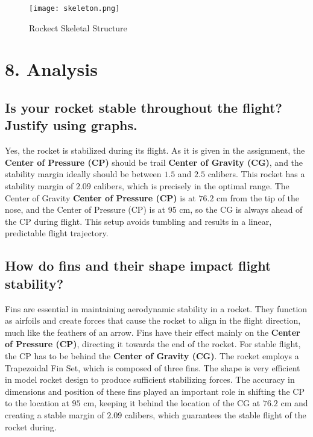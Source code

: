 \documentclass[12pt, a4paper]{article}
\begin{document}
\begin{figure}[H]
    \centering
    \texttt{[image: skeleton.png]}
    \caption{Rockect Skeletal Structure}
    \label{fig:enter-label}
\end{figure}

\section*{8. Analysis}

\subsection{Is your rocket stable throughout the flight? Justify using graphs.}
Yes, the rocket is stabilized during its flight. As it is given in the assignment, the \textbf{Center of Pressure (CP)} should be trail  \textbf{Center of Gravity (CG)}, and the stability margin ideally should be between $1.5$ and $2.5$ calibers. This rocket has a stability margin of $2.09$ calibers, which is precisely in the optimal range. The Center of Gravity \textbf{Center of Pressure (CP)} is at $76.2 \text{ cm}$ from the tip of the nose, and the Center of Pressure (CP) is at 95 cm, so the CG is always ahead of the CP during flight. This setup avoids tumbling and results in a linear, predictable flight trajectory.

\subsection{How do fins and their shape impact flight stability?}
Fins are essential in maintaining aerodynamic stability in a rocket. They function as airfoils and create forces that cause the rocket to align in the flight direction, much like the feathers of an arrow. Fins have their effect mainly on the  \textbf{Center of Pressure (CP)}, directing it towards the end of the rocket. For stable flight, the CP has to be behind the  \textbf{Center of Gravity (CG)}. The rocket employs a Trapezoidal Fin Set, which is composed of three fins. The shape is very efficient in model rocket design to produce sufficient stabilizing forces. The accuracy in dimensions and position of these fins played an important role in shifting the CP to the location at $95 \text{ cm}$, keeping it behind the location of the CG at $76.2 \text{ cm}$ and creating a stable margin of $2.09$ calibers, which guarantees the stable flight of the rocket during.
\end{document}

